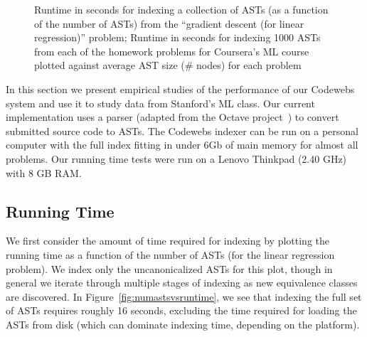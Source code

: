 \begin{figure}[t!]
  \center
  \caption[Runtime of AST indexing]{ Runtime in seconds for indexing a collection of ASTs (as a function of the number of ASTs)
  from the ``gradient descent (for linear regression)'' problem;
   Runtime in seconds for indexing 1000 ASTs from each of the homework problems for Coursera's ML course plotted
  against average AST size (\# nodes) for each problem}
\end{figure}

In this section we present  empirical studies
of the performance of our Codewebs system and use it to study data from Stanford's ML class.
Our current implementation uses a parser (adapted from the Octave project~\cite{eaton97}) to convert
submitted source code to ASTs.   The Codewebs indexer can be run on a personal
computer with the full index fitting in under 6Gb of main memory for almost all problems.
Our running time tests were run on a %
Lenovo Thinkpad 
(2.40 GHz) with 8 GB RAM.


\subsection{Running Time}
We first consider the amount of time required for indexing 
by plotting the running time 
 as a function of the number of ASTs (for the linear regression problem).
We index only the uncanonicalized ASTs for this plot, though in general we iterate through multiple stages of indexing
as new equivalence classes are discovered.
In Figure~\ref{fig:numastsvsruntime}, we see that indexing the full set of ASTs requires roughly 16 seconds, excluding the time required for loading the ASTs 
from disk (which can dominate indexing time, depending on the platform).  

